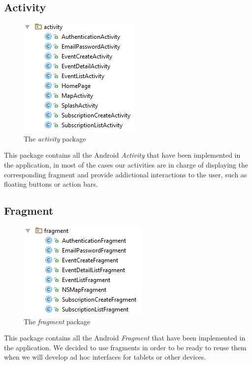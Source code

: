 \documentclass[a4paper]{scrreprt}
\begin{document}
\subsection{Activity}
\begin{figure}[H]
	\centering
	\includegraphics{pack_activity}
	\caption{The \emph{activity} package}
\end{figure}
This package contains all the Android \emph{Activity} that have been implemented in the application, in most of the cases our activities are in charge of displaying the corresponding fragment and provide addictional interactions to the user, such as floating buttons or action bars.

\subsection{Fragment}
\begin{figure}[H]
	\centering
	\includegraphics{pack_fragment}
	\caption{The \emph{fragment} package}
\end{figure}
This package contains all the Android \emph{Fragment} that have been implemented in the application. We decided to use fragments in order to be ready to reuse them when we will develop ad hoc interfaces for tablets or other devices.
\end{document}
